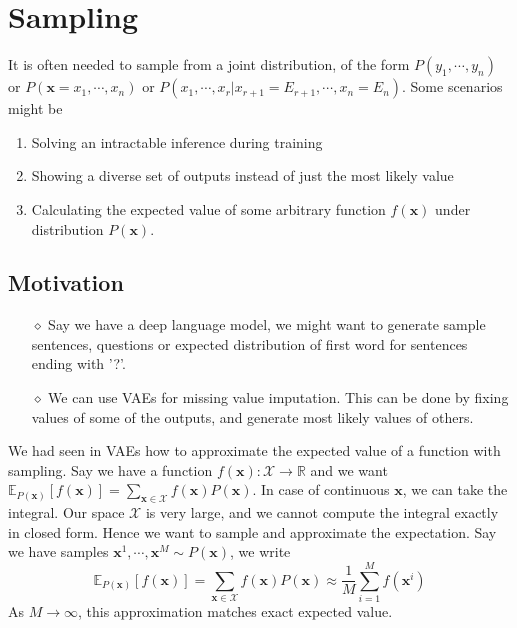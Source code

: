 \section{Sampling}
It is often needed to sample from a joint distribution, of the form $P(y_1, \cdots, y_n)$ or $P(\mathbf x = x_1, \cdots, x_n)$ or $P(x_1, \cdots, x_r | x_{r+1} = E_{r+1}, \cdots, x_n = E_n)$. Some scenarios might be
\begin{enumerate}
	\item Solving an intractable inference during training
	\item Showing a diverse set of outputs instead of just the most likely value
	\item Calculating the expected value of some arbitrary function $f(\mathbf x)$ under distribution $P(\mathbf x)$.
\end{enumerate}
\subsection{Motivation}
\begin{itemize}
	\item[$\diamond$] Say we have a deep language model, we might want to generate sample sentences, questions or expected distribution of first word for sentences ending with '?'.
	\item [$\diamond$] We can use VAEs for missing value imputation. This can be done by fixing values of some of the outputs, and generate most likely values of others.  
\end{itemize}
We had seen in VAEs how to approximate the expected value of a function with sampling. Say we have a function $f(\mathbf x): \mathcal{X} \to \mathbb{R}$ and we want $\mathbb{E}_{P(\mathbf x)}[f(\mathbf x)] = \sum_{\mathbf x \in \mathcal X} f(\mathbf x) P(\mathbf x)$. In case of continuous $\mathbf x$, we can take the integral. Our space $\mathcal X$ is very large, and we cannot compute the integral exactly in closed form. Hence we want to sample and approximate the expectation. Say we have samples $\mathbf x^1, \cdots, \mathbf x^M \sim P(\mathbf x)$, we write
\begin{equation}
	\mathbb{E}_{P(\mathbf x)}[f(\mathbf x)] = \sum_{\mathbf x \in \mathcal X} f(\mathbf x) P(\mathbf x) \approx \dfrac{1}{M} \sum_{i=1}^M f(\mathbf x^i)
\end{equation}
As $M \to \infty$, this approximation matches exact expected value.
